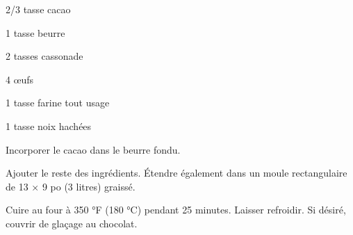 


\totaltime{}


\begin{ingredients}
    \item 2/3 tasse cacao
    \item 1 tasse beurre
    \item 2 tasses cassonade
    \item 4 œufs
    \item 1 tasse farine tout usage
    \item 1 tasse noix hachées
\end{ingredients}

\begin{steps}
    \item Incorporer le cacao dans le beurre fondu.
    \item Ajouter le reste des ingrédients. Étendre également dans un moule rectangulaire de 13 × 9 po (3 litres) graissé.
    \item Cuire au four à 350 °F (180 °C) pendant 25 minutes. Laisser refroidir. Si désiré, couvrir de glaçage au chocolat.
\end{steps}

